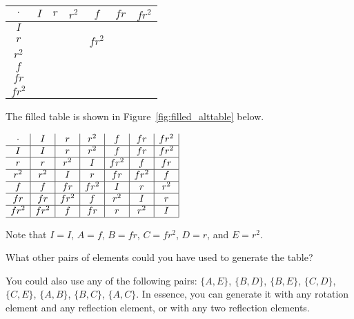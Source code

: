 \documentclass[../gatm_answers.tex]{subfiles}
\begin{document}
\begin{center}
\begin{tabular}{c|c|c|c|c|c|c|}
$\cdot$ & $I$ & $r$ & $r^2$ & $f$ & $fr$ & $fr^2$ \\ \hline
$I$    &   &   &   &   &   &   \\ \hline
$r$    &   &   &   & $fr^2$  &   &   \\ \hline
$r^2$    &   &   &   &   &   &   \\ \hline
$f$    &   &   &   &   &   &   \\ \hline
$fr$    &   &   &   &   &   &   \\ \hline
$fr^2$    &   &   &   &   &   &   \\ \hline
\end{tabular}
\label{fig:alttable}
\end{center}

The filled table is shown in Figure~\ref{fig:filled_alttable} below.
\begin{center}
$\begin{array}{c|c|c|c|c|c|c|}
\cdot & I & r & r^2 & f & fr & fr^2 \\ \hline
I & I & r & r^2 & f & fr & fr^2 \\ \hline
r & r & r^2 & I & fr^2 & f & fr \\ \hline
r^2 & r^2 & I & r & fr & fr^2 & f \\ \hline
f & f & fr & fr^2 & I & r & r^2 \\ \hline
fr & fr & fr^2 & f & r^2 & I & r \\ \hline
fr^2 & fr^2 & f & fr & r & r^2 & I \\ \hline
\end{array}$
\label{fig:filled_alttable}
\end{center}

Note that $I=I$, $A=f$, $B=fr$, $C=fr^2$, $D=r$, and $E=r^2$.

\begin{outer_problem}
\item What other pairs of elements could you have used to generate the table?
\end{outer_problem}

You could also use any of the following pairs: $\{A,E\}$, $\{B,D\}$, $\{B,E\}$, $\{C,D\}$, $\{C,E\}$, $\{A,B\}$, $\{B,C\}$, $\{A,C\}$. In essence, you can generate it with any rotation element and any reflection element, or with any two reflection elements.
\end{document}
